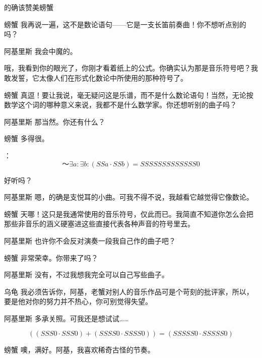 \begin{dialog}{的确该赞美螃蟹}
\begin{dialogue}
\item[螃蟹]我再说一遍，这不是数论语句——它是一支长笛前奏曲！你不想听点别的吗？

\item[阿基里斯]我会中魔的。


哦，我看到你的眼光了，你刚才看着纸上的公式。你确实认为那是音乐符号吧？我敢发誓，它太像人们在形式化数论中所使用的那种符号了。

\item[螃蟹]真逗！要让我说，毫无疑问这是乐谱，而不是什么数论语句！当然，无论按数学这个词的哪种意义来说，我都不是什么数学家。你还想听别的曲子吗？

\item[阿基里斯]那当然。你还有什么？

\item[螃蟹]多得很。

：
\[
～\exists a:\exists b:(SSa\cdot SSb)=SSSSSSSSSSSSS0
\]

好听吗？

\item[阿基里斯]嗯，的确是支悦耳的小曲。可我不得不说，我越看它越觉得它像数论。

\item[螃蟹]天哪！这只是我通常使用的音乐符号，仅此而已。我简直不知道你怎么会把那些非音乐的涵义硬塞进这些直接代表各种声音的符号里去。

\item[阿基里斯]也许你不会反对演奏一段我自己作的曲子吧？

\item[螃蟹]非常荣幸。你带来了吗？

\item[阿基里斯]没有，不过我想我完全可以自己写些曲子。

\item[乌龟]我必须告诉你，阿基，老蟹对别人的音乐作品可是个苛刻的批评家，所以，要是他对你的努力并不热心，你可别觉得失望。

\item[阿基里斯]多承关照。可我还是想试试……

\[
((SSS0\cdot SSS0)+(SSSS0\cdot SSSS0))=(SSSSS0\cdot SSSSS0)
\]

\item[螃蟹]噢，满好。阿基，我喜欢稀奇古怪的节奏。


\end{dialogue}
\end{dialog}
